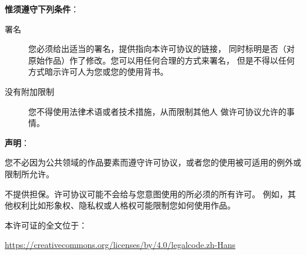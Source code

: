 \documentclass{../runikraft-report}
\begin{document}
\vspace{2ex}
\noindent\textbf{\large 惟须遵守下列条件}：
\begin{description}
\item[署名] 您必须给出适当的署名，提供指向本许可协议的链接，
同时标明是否（对原始作品）作了修改。您可以用任何合理的方式来署名，
但是不得以任何方式暗示许可人为您或您的使用背书。
\item[没有附加限制] 您不得使用法律术语或者技术措施，从而限制其他人
做许可协议允许的事情。
\end{description}

\vspace{2ex}
\noindent\textbf{\large 声明}：

您不必因为公共领域的作品要素而遵守许可协议，或者您的使用被可适用的例外或限制所允许。

不提供担保。许可协议可能不会给与您意图使用的所必须的所有许可。
例如，其他权利比如形象权、隐私权或人格权可能限制您如何使用作品。

本许可证的全文位于：\\
\centerline{\url{https://creativecommons.org/licenses/by/4.0/legalcode.zh-Hans}}
\end{document}
